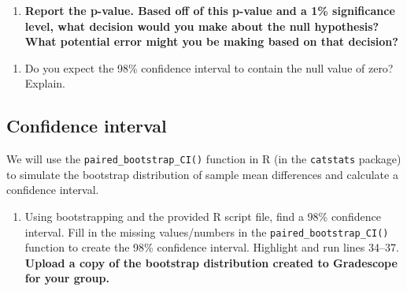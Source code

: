 \documentclass[
]{report}
\newenvironment{Shaded}{\begin{snugshade}}{\end{snugshade}}
\newcommand{\AttributeTok}[1]{\textcolor[rgb]{0.13,0.29,0.53}{#1}}
\newcommand{\CommentTok}[1]{\textcolor[rgb]{0.56,0.35,0.01}{\textit{#1}}}
\newcommand{\DecValTok}[1]{\textcolor[rgb]{0.00,0.00,0.81}{#1}}
\newcommand{\FunctionTok}[1]{\textcolor[rgb]{0.13,0.29,0.53}{\textbf{#1}}}
\newcommand{\NormalTok}[1]{#1}
\newcommand{\SpecialCharTok}[1]{\textcolor[rgb]{0.81,0.36,0.00}{\textbf{#1}}}
\providecommand{\tightlist}{%
  \setlength{\itemsep}{0pt}\setlength{\parskip}{0pt}}
\begin{document}
\begin{enumerate}
\def\labelenumi{\arabic{enumi}.}
\setcounter{enumi}{10}
\tightlist
\item
  \textbf{Report the p-value. Based off of this p-value and a 1\% significance level, what decision would you make about the null hypothesis? What potential error might you be making based on that decision?}
\end{enumerate}

\vspace{0.5in}

\begin{enumerate}
\def\labelenumi{\arabic{enumi}.}
\setcounter{enumi}{11}
\tightlist
\item
  Do you expect the 98\% confidence interval to contain the null value of zero? Explain.
\end{enumerate}

\vspace{0.8in}

\subsection*{Confidence interval}\label{confidence-interval-5}

We will use the \texttt{paired\_bootstrap\_CI()} function in R (in the \texttt{catstats} package) to simulate the bootstrap distribution of sample mean differences and calculate a confidence interval.

\begin{enumerate}
\def\labelenumi{\arabic{enumi}.}
\setcounter{enumi}{12}
\tightlist
\item
  Using bootstrapping and the provided R script file, find a 98\% confidence interval. Fill in the missing values/numbers in the \texttt{paired\_bootstrap\_CI()} function to create the 98\% confidence interval. Highlight and run lines 34--37. \textbf{Upload a copy of the bootstrap distribution created to Gradescope for your group.}
\end{enumerate}

\begin{Shaded}
\end{Shaded}
\end{document}
